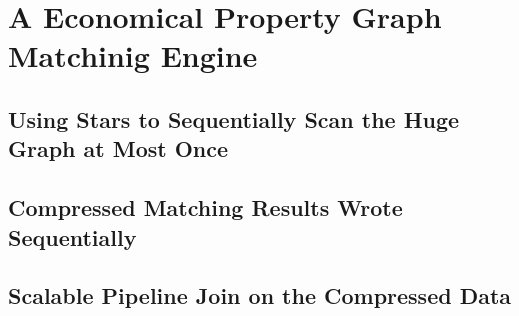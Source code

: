 \section{A Economical Property Graph Matchinig Engine}\label{sec:match}
\subsection{Using Stars to Sequentially Scan the Huge Graph at Most Once}
\subsection{Compressed Matching Results Wrote Sequentially}
\subsection{Scalable Pipeline Join on the Compressed Data}
